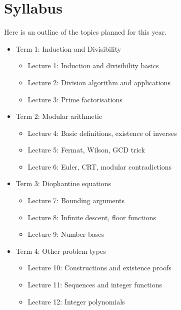 \documentclass{article}
\begin{document}
\section{Syllabus}
Here is an outline of the topics planned for this year.
\begin{itemize}
  \item Term 1: Induction and Divisibility
    \begin{itemize}
      \item Lecture 1: Induction and divisibility basics
      \item Lecture 2: Division algorithm and applications
      \item Lecture 3: Prime factorisations
    \end{itemize}
  \item Term 2: Modular arithmetic
    \begin{itemize}
      \item Lecture 4: Basic definitions, existence of inverses
      \item Lecture 5: Fermat, Wilson, GCD trick
      \item Lecture 6: Euler, CRT, modular contradictions
    \end{itemize}
  \item Term 3: Diophantine equations
    \begin{itemize}
      \item Lecture 7: Bounding arguments
      \item Lecture 8: Infinite descent, floor functions
      \item Lecture 9: Number bases
    \end{itemize}
  \item Term 4: Other problem types
    \begin{itemize}
      \item Lecture 10: Constructions and existence proofs
      \item Lecture 11: Sequences and integer functions
      \item Lecture 12: Integer polynomials
    \end{itemize}
\end{itemize}
\end{document}
